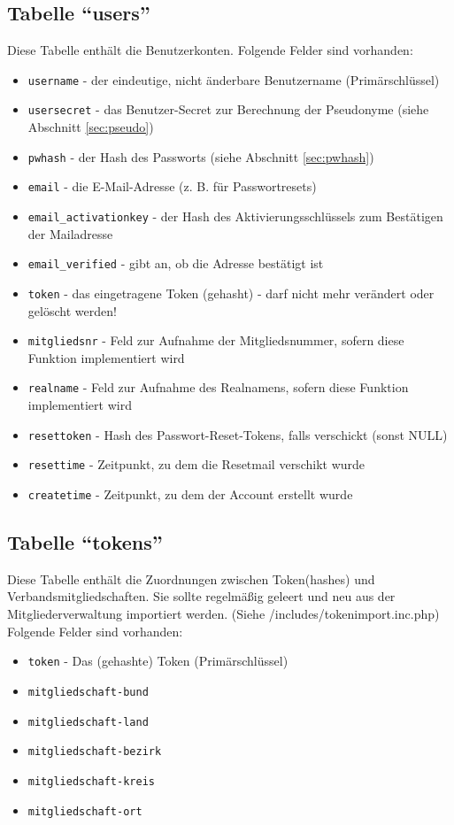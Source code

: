 \documentclass[parskip=half]{scrartcl}
\begin{document}
\subsection{Tabelle "`users"'}
Diese Tabelle enthält die Benutzerkonten. Folgende Felder sind vorhanden:
\begin{itemize}
	\item \texttt{username} - der eindeutige, nicht änderbare Benutzername (Primärschlüssel)
	\item \texttt{usersecret} - das Benutzer-Secret zur Berechnung der Pseudonyme (siehe Abschnitt \ref{sec:pseudo})
	\item \texttt{pwhash} - der Hash des Passworts (siehe Abschnitt \ref{sec:pwhash})
	\item \texttt{email} - die E-Mail-Adresse (z. B. für Passwortresets)
	\item \texttt{email\_activationkey} - der Hash des Aktivierungsschlüssels zum Bestätigen der Mailadresse
	\item \texttt{email\_verified} - gibt an, ob die Adresse bestätigt ist
	\item \texttt{token} - das eingetragene Token (gehasht) - darf nicht mehr verändert oder gelöscht werden!
	\item \texttt{mitgliedsnr} - Feld zur Aufnahme der Mitgliedsnummer, sofern diese Funktion implementiert wird
	\item \texttt{realname} - Feld zur Aufnahme des Realnamens, sofern diese Funktion implementiert wird
	\item \texttt{resettoken} - Hash des Passwort-Reset-Tokens, falls verschickt (sonst NULL)
	\item \texttt{resettime} - Zeitpunkt, zu dem die Resetmail verschikt wurde
	\item \texttt{createtime} - Zeitpunkt, zu dem der Account erstellt wurde
\end{itemize}


\subsection{Tabelle "`tokens"'}
Diese Tabelle enthält die Zuordnungen zwischen Token(hashes) und Verbandsmitgliedschaften.
Sie sollte regelmäßig geleert und neu aus der Mitgliederverwaltung importiert werden. (Siehe /includes/tokenimport.inc.php)
Folgende Felder sind vorhanden:
\begin{itemize}
	\item \texttt{token} - Das (gehashte) Token (Primärschlüssel)
	\item \texttt{mitgliedschaft-bund}
	\item \texttt{mitgliedschaft-land}
	\item \texttt{mitgliedschaft-bezirk}
	\item \texttt{mitgliedschaft-kreis}
	\item \texttt{mitgliedschaft-ort}
\end{itemize}
\end{document}
